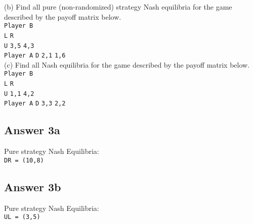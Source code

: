 \documentclass[twoside]{article}
\begin{document}
(b) Find all pure (non-randomized) strategy Nash equilibria for the game described by the payoff matrix below.\\

\hspace*{40mm}\texttt{Player B }\\
\hspace*{40mm}\texttt{L} \hspace*{15mm}\texttt{R}\\
\hspace*{24mm}\texttt{U} \hspace{12mm}\texttt{3,5} \hspace{12mm}\texttt{4,3}\\
\texttt{Player A} \hspace*{8mm}\texttt{D} \hspace{12mm}\texttt{2,1} \hspace{12mm}\texttt{1,6}\\

(c) Find all Nash equilibria for the game described by the payoff matrix below.\\

\hspace*{40mm}\texttt{Player B }\\
\hspace*{40mm}\texttt{L} \hspace*{15mm}\texttt{R}\\
\hspace*{24mm}\texttt{U} \hspace{12mm}\texttt{1,1} \hspace{12mm}\texttt{4,2}\\
\texttt{Player A} \hspace*{8mm}\texttt{D} \hspace{12mm}\texttt{3,3} \hspace{12mm}\texttt{2,2}\\

\subsection{Answer 3a}

Pure strategy Nash Equilibria: \\
\texttt{DR = (10,8)}

\subsection{Answer 3b}

Pure strategy Nash Equilibria: \\
\texttt{UL = (3,5)}
\end{document}
